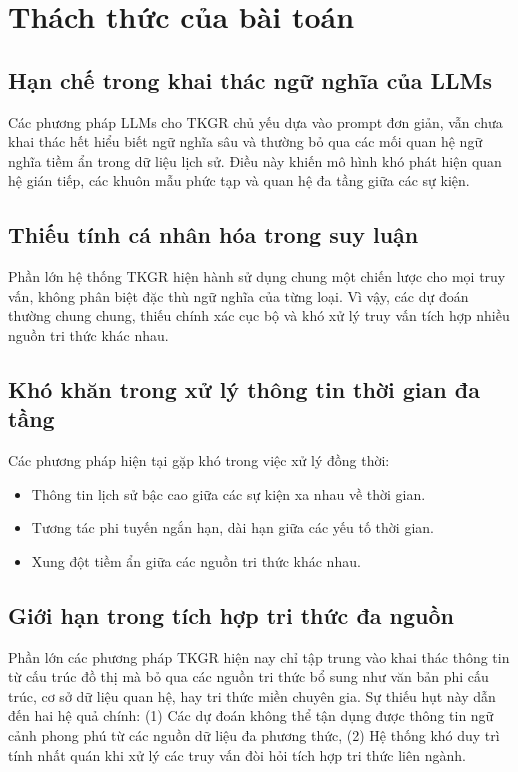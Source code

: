 \section{Thách thức của bài toán}

\subsection{Hạn chế trong khai thác ngữ nghĩa của LLMs}
Các phương pháp LLMs cho TKGR chủ yếu dựa vào prompt đơn giản, vẫn chưa khai thác hết hiểu biết ngữ nghĩa sâu và thường bỏ qua các mối quan hệ ngữ nghĩa tiềm ẩn trong dữ liệu lịch sử. Điều này khiến mô hình khó phát hiện quan hệ gián tiếp, các khuôn mẫu phức tạp và quan hệ đa tầng giữa các sự kiện.

\subsection{Thiếu tính cá nhân hóa trong suy luận}
Phần lớn hệ thống TKGR hiện hành sử dụng chung một chiến lược cho mọi truy vấn, không phân biệt đặc thù ngữ nghĩa của từng loại. Vì vậy, các dự đoán thường chung chung, thiếu chính xác cục bộ và khó xử lý truy vấn tích hợp nhiều nguồn tri thức khác nhau.

\subsection{Khó khăn trong xử lý thông tin thời gian đa tầng}
Các phương pháp hiện tại gặp khó trong việc xử lý đồng thời:
\begin{itemize}
    \item Thông tin lịch sử bậc cao giữa các sự kiện xa nhau về thời gian.
    \item Tương tác phi tuyến ngắn hạn, dài hạn giữa các yếu tố thời gian.
    \item Xung đột tiềm ẩn giữa các nguồn tri thức khác nhau.
\end{itemize}

\subsection{Giới hạn trong tích hợp tri thức đa nguồn}
Phần lớn các phương pháp TKGR hiện nay chỉ tập trung vào khai thác thông tin từ cấu trúc đồ thị mà bỏ qua các nguồn tri thức bổ sung như văn bản phi cấu trúc, cơ sở dữ liệu quan hệ, hay tri thức miền chuyên gia. Sự thiếu hụt này dẫn đến hai hệ quả chính: (1) Các dự đoán không thể tận dụng được thông tin ngữ cảnh phong phú từ các nguồn dữ liệu đa phương thức, (2) Hệ thống khó duy trì tính nhất quán khi xử lý các truy vấn đòi hỏi tích hợp tri thức liên ngành.

